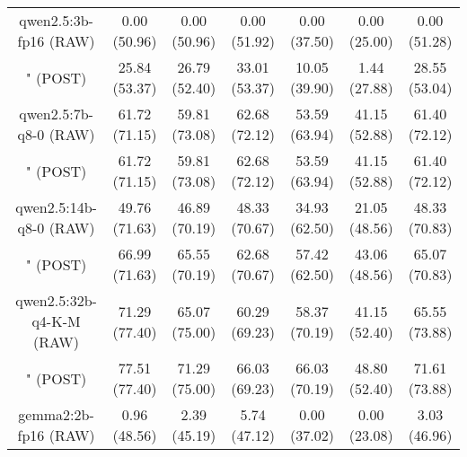 \begin{table}[]
{\begin{tabular}{ccccccc}
        \multicolumn{1}{c|}{qwen2.5:3b-fp16 (RAW)} & 0.00 (50.96) & 0.00 (50.96) & \multicolumn{1}{c|}{0.00 (51.92)} & 0.00 (37.50) & \multicolumn{1}{c|}{0.00 (25.00)} & 0.00 (51.28) \\
        
        

        \multicolumn{1}{c|}{" (POST)} & 25.84 (53.37) & 26.79 (52.40) & \multicolumn{1}{c|}{33.01 (53.37)} & 10.05 (39.90) & \multicolumn{1}{c|}{1.44 (27.88)} & 28.55 (53.04) \\
        \cline{1-7}
        

        \multicolumn{1}{c|}{qwen2.5:7b-q8-0 (RAW)} & 61.72 (71.15) & 59.81 (73.08) & \multicolumn{1}{c|}{62.68 (72.12)} & 53.59 (63.94) & \multicolumn{1}{c|}{41.15 (52.88)} & 61.40 (72.12) \\
        
        

        \multicolumn{1}{c|}{" (POST)} & 61.72 (71.15) & 59.81 (73.08) & \multicolumn{1}{c|}{62.68 (72.12)} & 53.59 (63.94) & \multicolumn{1}{c|}{41.15 (52.88)} & 61.40 (72.12) \\
        \cline{1-7}
        

        \multicolumn{1}{c|}{qwen2.5:14b-q8-0 (RAW)} & 49.76 (71.63) & 46.89 (70.19) & \multicolumn{1}{c|}{48.33 (70.67)} & 34.93 (62.50) & \multicolumn{1}{c|}{21.05 (48.56)} & 48.33 (70.83) \\
        
        

        \multicolumn{1}{c|}{" (POST)} & 66.99 (71.63) & 65.55 (70.19) & \multicolumn{1}{c|}{62.68 (70.67)} & 57.42 (62.50) & \multicolumn{1}{c|}{43.06 (48.56)} & 65.07 (70.83) \\
        \cline{1-7}
        

        \multicolumn{1}{c|}{qwen2.5:32b-q4-K-M (RAW)} & 71.29 (77.40) & 65.07 (75.00) & \multicolumn{1}{c|}{60.29 (69.23)} & 58.37 (70.19) & \multicolumn{1}{c|}{41.15 (52.40)} & 65.55 (73.88) \\
        
        

        \multicolumn{1}{c|}{" (POST)} & 77.51 (77.40) & 71.29 (75.00) & \multicolumn{1}{c|}{66.03 (69.23)} & 66.03 (70.19) & \multicolumn{1}{c|}{48.80 (52.40)} & 71.61 (73.88) \\
        \cline{1-7}
        

        \multicolumn{1}{c|}{gemma2:2b-fp16 (RAW)} & 0.96 (48.56) & 2.39 (45.19) & \multicolumn{1}{c|}{5.74 (47.12)} & 0.00 (37.02) & \multicolumn{1}{c|}{0.00 (23.08)} & 3.03 (46.96) \\
        

\end{tabular}}
\end{table}
